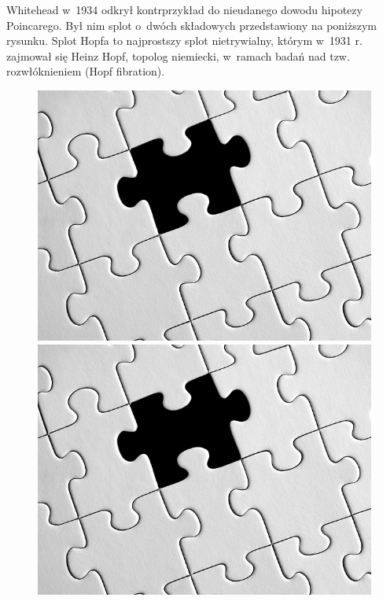 \begin{example}
    Whitehead w~1934 odkrył kontrprzykład do nieudanego dowodu hipotezy Poincarego.
    Był nim splot o~dwóch składowych przedstawiony na poniższym rysunku.
    Splot Hopfa to najprostszy splot nietrywialny, którym w~1931 r. zajmował się Heinz Hopf,
    topolog niemiecki, w~ramach badań nad tzw. rozwłóknieniem (Hopf fibration).

    \begin{figure}[H]
        \begin{minipage}[b]{.32\linewidth}
            \centering
            \includegraphics[width=\linewidth]{../data/missing.jpg}
        \end{minipage}
        \begin{minipage}[b]{.32\linewidth}
            \centering
            \includegraphics[width=\linewidth]{../data/missing.jpg}

\end{minipage}
\end{figure}
\end{example}
